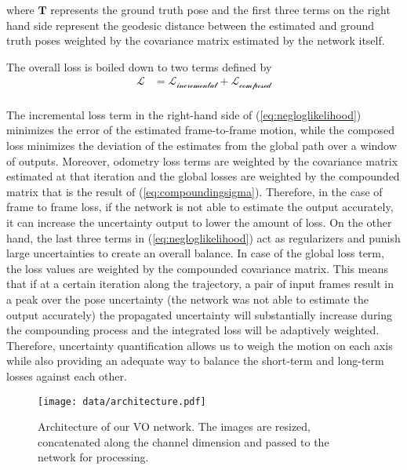 \documentclass[letterpaper, 10 pt]{ieeeconf}  %
\begin{document}
where $\mathbf{T}$ represents the ground truth pose and the first three terms on the right hand side represent the geodesic distance between the estimated and ground truth poses weighted by the covariance matrix estimated by the network itself.

The overall loss is boiled down to two terms defined by
\begin{equation}
\begin{split}
\mathcal{L} &= \mathcal{L_{\text{incremental}}}+\mathcal{L_{\text{composed}}}\\
\end{split}
\label{eq:negloglikelihood}
\end{equation}

The incremental loss term in the right-hand side of (\ref{eq:negloglikelihood}) minimizes the error of the estimated frame-to-frame motion, while the composed loss minimizes the deviation of the estimates from the global path over a window of outputs. Moreover, odometry loss terms are weighted by the covariance matrix estimated at that iteration and the global losses are weighted by the compounded matrix that is the result of (\ref{eq:compoundingsigma}). Therefore, 
in the case of frame to frame loss, if the network is not able to estimate the output accurately, it can increase the uncertainty output to lower the amount of loss. On the other hand, the last three terms in  (\ref{eq:negloglikelihood}) act as regularizers and punish large uncertainties to create an overall balance. In case of the global loss term, the loss values are weighted by the compounded covariance matrix. This means that if at a certain iteration along the trajectory, a pair of input frames result in a peak over the pose uncertainty (the network was not able to estimate the output accurately) the propagated uncertainty will substantially increase during the compounding process and the integrated loss will be adaptively weighted. Therefore, uncertainty quantification allows us to weigh the motion on each axis while also providing an adequate way to balance the short-term and long-term losses against each other.

\begin{figure*}[t]
   \hspace{0.4cm}
   \texttt{[image: data/architecture.pdf]}
   \caption{Architecture of our VO network. The images are resized, concatenated along the channel dimension and passed to the network for processing.}
   \label{fig:architecture}
\end{figure*}
\end{document}
